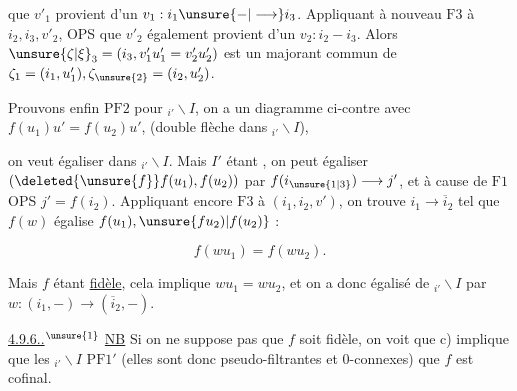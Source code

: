 
que $v'_1$ provient d'un $v_1:i_1\unsure{\mathbin{-}|\longrightarrow}i_3$. Appliquant à nouveau $\mathrm{F}3$ à $i_2,i_3,v'_2$, OPS que $v'_2$ également provient d'un $v_2:i_2\mathbin{-}i_3$. Alors $\unsure{\zeta|\xi}_3=(i_3,v'_1u'_1=v'_2u'_2)$ est un majorant commun de $\zeta_1=(i_1,u'_1),\zeta_{\unsure{2}}=(i_2,u'_2)$.

Prouvons enfin $\mathrm{PF}2$ pour $ {}_{i'}\backslash I$,  on a un diagramme ci-contre avec $f(u_1)u'=f(u_2)u'$, (double flèche dans $ {}_{i'}\backslash I$),


on veut égaliser dans $ {}_{i'}\backslash I$. Mais $I'$ étant , on peut égaliser $(\deleted{\unsure{f}}f(u_1),f(u_2))$ par $f(i_{\unsure{1|3}})\longrightarrow j'$, et à cause de $\mathrm{F}1$ OPS $j'=f(i_2)$. Appliquant encore $\mathrm{F}3$ à $(i_1,i_2,v')$, on trouve $i_1\longrightarrow\overline{i}_2$ tel que $f(w)$ égalise $f(u_1),\unsure{fu_2)|f(u_2)}$ :

\[f(wu_1)=f(wu_2).\]

Mais $f$ étant \uline{fidèle}, cela implique $wu_1=wu_2$, et on a donc égalisé   de $ {}_{i'}\backslash I$ par $w:(i_1,-)\longrightarrow(\overline{i}_2,-)$.

\uline{4.9.6..$^{\unsure{1}}$} \uline{NB} \inserted{\textcircled{$\uparrow$}} Si on ne suppose pas que $f$ soit fidèle, on voit que  c) implique  que les $ {}_{i'}\backslash I$  $\mathrm{PF}1'$ (elles sont donc  pseudo-filtrantes et $0$-connexes)  que $f$ est cofinal. 

